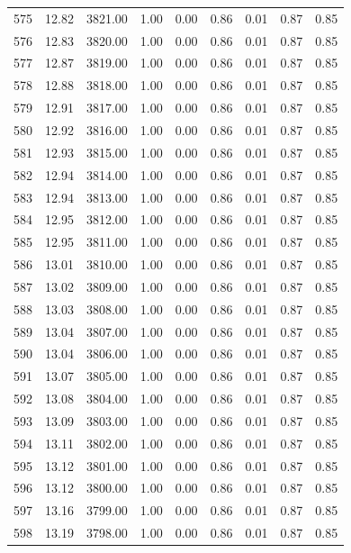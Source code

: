 \documentclass{article}\usepackage[]{graphicx}\usepackage[]{color}
\begin{document}
\begin{longtable}{rrrrrrrrr}
  575 & 12.82 & 3821.00 & 1.00 & 0.00 & 0.86 & 0.01 & 0.87 & 0.85 \\ 
  576 & 12.83 & 3820.00 & 1.00 & 0.00 & 0.86 & 0.01 & 0.87 & 0.85 \\ 
  577 & 12.87 & 3819.00 & 1.00 & 0.00 & 0.86 & 0.01 & 0.87 & 0.85 \\ 
  578 & 12.88 & 3818.00 & 1.00 & 0.00 & 0.86 & 0.01 & 0.87 & 0.85 \\ 
  579 & 12.91 & 3817.00 & 1.00 & 0.00 & 0.86 & 0.01 & 0.87 & 0.85 \\ 
  580 & 12.92 & 3816.00 & 1.00 & 0.00 & 0.86 & 0.01 & 0.87 & 0.85 \\ 
  581 & 12.93 & 3815.00 & 1.00 & 0.00 & 0.86 & 0.01 & 0.87 & 0.85 \\ 
  582 & 12.94 & 3814.00 & 1.00 & 0.00 & 0.86 & 0.01 & 0.87 & 0.85 \\ 
  583 & 12.94 & 3813.00 & 1.00 & 0.00 & 0.86 & 0.01 & 0.87 & 0.85 \\ 
  584 & 12.95 & 3812.00 & 1.00 & 0.00 & 0.86 & 0.01 & 0.87 & 0.85 \\ 
  585 & 12.95 & 3811.00 & 1.00 & 0.00 & 0.86 & 0.01 & 0.87 & 0.85 \\ 
  586 & 13.01 & 3810.00 & 1.00 & 0.00 & 0.86 & 0.01 & 0.87 & 0.85 \\ 
  587 & 13.02 & 3809.00 & 1.00 & 0.00 & 0.86 & 0.01 & 0.87 & 0.85 \\ 
  588 & 13.03 & 3808.00 & 1.00 & 0.00 & 0.86 & 0.01 & 0.87 & 0.85 \\ 
  589 & 13.04 & 3807.00 & 1.00 & 0.00 & 0.86 & 0.01 & 0.87 & 0.85 \\ 
  590 & 13.04 & 3806.00 & 1.00 & 0.00 & 0.86 & 0.01 & 0.87 & 0.85 \\ 
  591 & 13.07 & 3805.00 & 1.00 & 0.00 & 0.86 & 0.01 & 0.87 & 0.85 \\ 
  592 & 13.08 & 3804.00 & 1.00 & 0.00 & 0.86 & 0.01 & 0.87 & 0.85 \\ 
  593 & 13.09 & 3803.00 & 1.00 & 0.00 & 0.86 & 0.01 & 0.87 & 0.85 \\ 
  594 & 13.11 & 3802.00 & 1.00 & 0.00 & 0.86 & 0.01 & 0.87 & 0.85 \\ 
  595 & 13.12 & 3801.00 & 1.00 & 0.00 & 0.86 & 0.01 & 0.87 & 0.85 \\ 
  596 & 13.12 & 3800.00 & 1.00 & 0.00 & 0.86 & 0.01 & 0.87 & 0.85 \\ 
  597 & 13.16 & 3799.00 & 1.00 & 0.00 & 0.86 & 0.01 & 0.87 & 0.85 \\ 
  598 & 13.19 & 3798.00 & 1.00 & 0.00 & 0.86 & 0.01 & 0.87 & 0.85 \\ 

\end{longtable}
\end{document}
